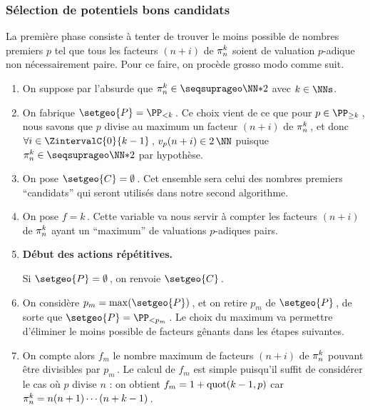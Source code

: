 \subsubsection{Sélection de potentiels bons candidats} \label{algo-select}

\leavevmode
\smallskip

La première phase consiste à tenter de trouver le moins possible de nombres premiers $p$ tel que tous les facteurs $(n+i)$ de $\consprod$ soient de valuation $p$-adique non nécessairement paire. Pour ce faire, on procède grosso modo comme suit.

\begin{enumerate}
	\item On suppose par l'absurde que $\consprod \in \NNssquare$ avec $k \in \NNs$.


	\item On fabrique $\setgeo{P} = \PP_{<k}$\,.
	Ce choix vient de ce que pour $p \in \PP_{\geq k}$\,, nous savons que $p$ divise au maximum un facteur $(n+i)$ de $\consprod$\,, et donc $\forall i \in \ZintervalC{0}{k-1}$\,, $\padicval{n+i} \in 2\,\NN$ puisque $\consprod \in \NNssquare$ par hypothèse.


	\item On pose $\setgeo{C} = \emptyset$\,. Cet ensemble sera celui des nombres premiers \enquote{candidats} qui seront utilisés dans notre second algorithme.


	\item On pose $f = k$\,. Cette variable va nous servir à compter les facteurs $(n+i)$ de $\consprod$ ayant un \enquote{maximum} de valuations $p$-adiques pairs.


	\item \label{algo-select-restart}
	\textbf{Début des actions répétitives.}
	
	\noindent
	Si $\setgeo{P} = \emptyset$\,, on renvoie $\setgeo{C}$\,.


	\item On considère $p_m = \max ( \setgeo{P})$\,, et on retire $p_m$ de $\setgeo{P}$\,, de sorte que $\setgeo{P} = \PP_{< p_m}$\,. Le choix du maximum va permettre d'éliminer le moins possible de facteurs gênants dans les étapes suivantes. 


	\item On compte alors $f_m$ le nombre maximum de facteurs $(n+i)$ de $\consprod$ pouvant être divisibles par $p_m$\,.
	Le calcul de $f_m$ est simple puisqu'il suffit de considérer le cas où $p$ divise $n$ : on obtient $f_m = 1 + \mathrm{quot}( k-1 , p)$ car $\consprod = n (n + 1) \cdots (n + k - 1)$\,.



\end{enumerate}
